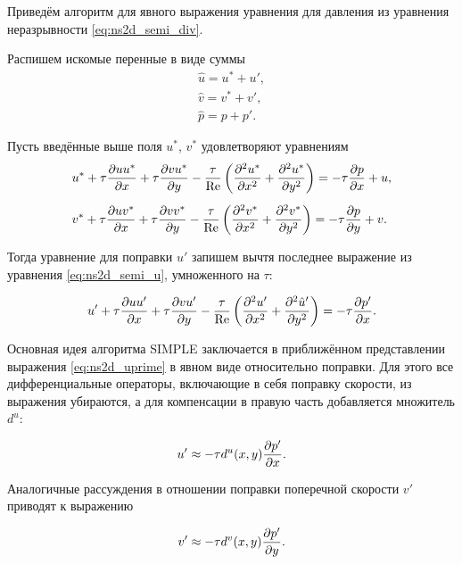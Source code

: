 \label{sec:simple-algo}

Приведём алгоритм для явного выражения уравнения для давления из
уравнения неразрывности \eqref{eq:ns2d_semi_div}.

Распишем искомые перенные в виде суммы 
\begin{equation}
    \label{eq:ns2d_decomp}
\begin{array}{l}
    \hat u = u^* + u',\\
    \hat v = v^* + v',\\
    \hat p = p + p'.
\end{array}
\end{equation}

Пусть введённые выше поля $u^*$, $v^*$ удовлетворяют уравнениям
\begin{align}
    \label{eq:ns2d_ustar}
    &u^* + \tau\frac{\partial u u^*}{\partial x} + \tau\frac{\partial v u^*}{\partial y}
       - \frac{\tau}{\mathrm{Re}}\left(\frac{\partial^2 u^*}{\partial x^2} + \frac{\partial^2 u^*}{\partial y^2}\right)
       = -\tau\frac{\partial p}{\partial x} + u, \\[5pt]
    \label{eq:ns2d_vstar}
    &v^* + \tau\frac{\partial u v^*}{\partial x} + \tau\frac{\partial v v^*}{\partial y}
       - \frac{\tau}{\mathrm{Re}}\left(\frac{\partial^2 v^*}{\partial x^2} + \frac{\partial^2 v^*}{\partial y^2}\right)
       = -\tau\frac{\partial p}{\partial y} + v.
\end{align}

Тогда уравнение для поправки $u'$ запишем вычтя последнее выражение из
уравнения \eqref{eq:ns2d_semi_u}, умноженного на $\tau$:

\begin{equation}
    \label{eq:ns2d_uprime}
    u' + \tau\frac{\partial u u'}{\partial x} + \tau\frac{\partial v u'}{\partial y}
       - \frac{\tau}{\mathrm{Re}}\left(\frac{\partial^2 u'}{\partial x^2} + \frac{\partial^2 \hat u'}{\partial y^2}\right)
       = -\tau\frac{\partial p'}{\partial x}.
\end{equation}

Основная идея алгоритма SIMPLE заключается в приближённом представлении выражения \eqref{eq:ns2d_uprime}
в явном виде относительно поправки. Для этого все дифференциальные операторы, включающие в себя поправку скорости,
из выражения убираются, а для компенсации в правую часть добавляется множитель $d^u$:

\begin{equation}
    \label{eq:ns2d_uprime_approx}
    u' \approx -\tau d^u(x, y) \frac{\partial p'}{\partial x}.
\end{equation}

Аналогичные рассуждения в отношении поправки поперечной скорости $v'$ приводят к выражению

\begin{equation}
    \label{eq:ns2d_vprime_approx}
    v' \approx -\tau d^v(x, y) \frac{\partial p'}{\partial y}.
\end{equation}

